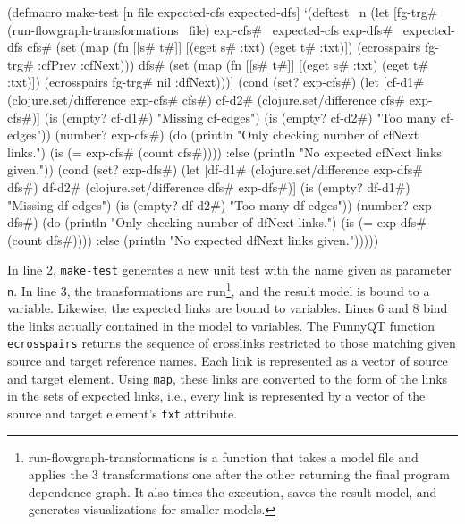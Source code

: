 \documentclass[11pt]{article}
\begin{document}
\begin{clojurecode}
(defmacro make-test [n file expected-cfs expected-dfs]
  `(deftest ~n
     (let [fg-trg# (run-flowgraph-transformations ~file)
           exp-cfs# ~expected-cfs
           exp-dfs# ~expected-dfs
           cfs# (set (map (fn [[s# t#]] [(eget s# :txt) (eget t# :txt)])
                          (ecrosspairs fg-trg# :cfPrev :cfNext)))
           dfs# (set (map (fn [[s# t#]] [(eget s# :txt) (eget t# :txt)])
                          (ecrosspairs fg-trg# nil :dfNext)))]
       (cond
        (set? exp-cfs#) (let [cf-d1# (clojure.set/difference exp-cfs# cfs#)
                              cf-d2# (clojure.set/difference cfs# exp-cfs#)]
                          (is (empty? cf-d1#) "Missing cf-edges")
                          (is (empty? cf-d2#) "Too many cf-edges"))
        (number? exp-cfs#) (do
                             (println "Only checking number of cfNext links.")
                             (is (= exp-cfs# (count cfs#))))
        :else (println "No expected cfNext links given."))
       (cond
        (set? exp-dfs#) (let [df-d1# (clojure.set/difference exp-dfs# dfs#)
                              df-d2# (clojure.set/difference dfs# exp-dfs#)]
                          (is (empty? df-d1#) "Missing df-edges")
                          (is (empty? df-d2#) "Too many df-edges"))
        (number? exp-dfs#) (do
                             (println "Only checking number of dfNext links.")
                             (is (= exp-dfs# (count dfs#))))
        :else (println "No expected dfNext links given.")))))
\end{clojurecode}

In line 2, \verb|make-test| generates a new unit test with the name given as
parameter \verb|n|.  In line 3, the transformations are
run\footnote{\textsf{run-flowgraph-transformations} is a function that takes a
  model file and applies the 3 transformations one after the other returning
  the final program dependence graph.  It also times the execution, saves the
  result model, and generates visualizations for smaller models.}, and the
result model is bound to a variable.  Likewise, the expected links are bound to
variables.  Lines 6 and 8 bind the links actually contained in the model to
variables.  The FunnyQT function \verb|ecrosspairs| returns the sequence of
crosslinks restricted to those matching given source and target reference
names.  Each link is represented as a vector of source and target element.
Using \verb|map|, these links are converted to the form of the links in the
sets of expected links, i.e., every link is represented by a vector of the
source and target element's \verb|txt| attribute.
\end{document}

